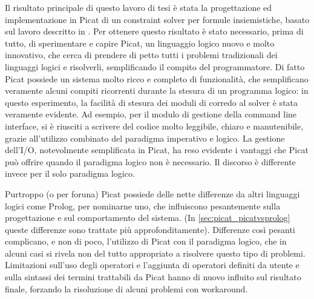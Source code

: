\documentclass[12pt,a4paper,openright]{book}  %
\begin{document}
Il risultato principale di questo lavoro di tesi è stata la
progettazione ed implementazione in Picat di un constraint solver per
formule insiemistiche, basato sul lavoro descritto in
\cite{Dovier00}. Per ottenere questo risultato è stato necessario,
prima di tutto, di sperimentare e capire Picat, un linguaggio logico
nuovo e molto innovativo, che cerca di prendere di petto tutti i
problemi tradizionali dei linguaggi logici e risolverli, semplificando
il compito del programmatore. Di fatto Picat possiede un sistema molto
ricco e completo di funzionalità, che semplificano veramente alcuni
compiti ricorrenti durante la stesura di un programma logico: in
questo esperimento, la facilità di stesura dei moduli di corredo al
solver è stata veramente evidente. Ad esempio, per il modulo di
gestione della command line interface, si è riusciti a scrivere del
codice molto leggibile, chiaro e manutenibile, grazie all'utilizzo
combinato del paradigma imperativo e logico. La gestione dell'I/O,
notevolmente semplificata in Picat, ha reso evidente i vantaggi che
Picat può offrire quando il paradigma logico non è necessario. Il
discorso è differente invece per il solo paradigma logico.

Purtroppo
(o per foruna) Picat possiede delle nette differenze da altri
linguaggi logici come Prolog, per nominarne uno, che influiscono
pesantemente sulla progettazione e sul comportamento del sistema. (In
\ref{sec:picat_picatvsprolog} queste differenze sono trattate più
approfonditamente). Differenze così pesanti complicano, e non di poco,
l'utilizzo di Picat con il paradigma logico, che in alcuni casi si
rivela non del tutto appropriato a risolvere questo tipo di
problemi. Limitazioni sull'uso degli operatori e l'aggiunta di
operatori definiti da utente e sulla sintassi dei termini trattabili
da Picat hanno di nuovo influito sul risultato finale, forzando la
risoluzione di alcuni problemi con workaround.
\end{document}

